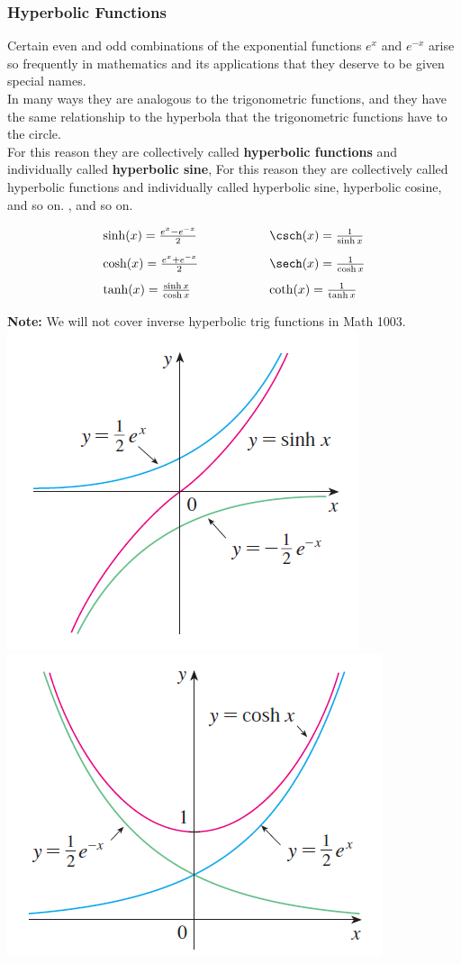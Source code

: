 \begin{frame}
\frametitle{Hyperbolic Functions}
Certain even and odd combinations of the exponential functions $ e^x $ and $ e^{-x} $  arise so frequently in mathematics and its applications that they deserve to be given special names.\\
In many ways they are analogous to the trigonometric functions, and they have the same relationship to the hyperbola that the trigonometric functions have to the circle.\\
For this reason they are collectively called \textbf{hyperbolic functions} and individually called \textbf{hyperbolic sine}, For this reason they are collectively called hyperbolic functions and individually called hyperbolic sine, hyperbolic cosine, and so on.
, and so on.
\end{frame}
\begin{frame}
\begin{definition}
\[
\begin{array}{l@{\extracolsep{2cm}}l}
\sinh(x) = \frac{e^x-e^{-x}}{2} & \csch(x)=\frac{1}{\sinh x}\\ [3mm]

\cosh(x) = \frac{e^x+e^{-x}}{2} & \sech(x)=\frac{1}{\cosh x}\\ [3mm]

\tanh(x) = \frac{\sinh x}{\cosh x} & \coth(x)=\frac{1}{\tanh x}\\
\end{array}
\]
\end{definition}

\textbf{Note:} We will not cover inverse hyperbolic trig functions in Math 1003. 
\includegraphics[width=0.35\linewidth]{../../modules/hyperbolic-functions/pictures/sinhGraph}\hfill 
\includegraphics[width=0.35\linewidth]{../../modules/hyperbolic-functions/pictures/CoshGraph}

\end{frame}


